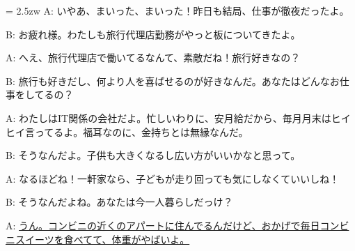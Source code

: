 \documentclass[11pt]{amsart}
\title{}
\author{}
\newenvironment{hangall}[1]{\hangindent = 2.5zw\everypar{\hangindent = 2.5zw}}{}
\begin{document}
\maketitle
\begin{hangall}{}%
A: いやあ、まいった、まいった！昨日も結局、仕事が徹夜だったよ。

B: お疲れ様。わたしも旅行代理店勤務がやっと板についてきたよ。

A: へえ、旅行代理店で働いてるなんて、素敵だね！旅行好きなの？

B: 旅行も好きだし、何より人を喜ばせるのが好きなんだ。あなたはどんなお仕事をしてるの？

A: わたしはIT関係の会社だよ。忙しいわりに、安月給だから、毎月月末はヒイヒイ言ってるよ。福耳なのに、金持ちとは無縁なんだ。

B: そうなんだよ。子供も大きくなるし広い方がいいかなと思って。

A: なるほどね！一軒家なら、子どもが走り回っても気にしなくていいしね！

B: そうなんだよね。あなたは今一人暮らしだっけ？

A: \ul{うん。コンビニの近くのアパートに住んでるんだけど、おかげで毎日コンビニスイーツを食べてて、体重がやばいよ。}\end{hangall}
\end{document}
